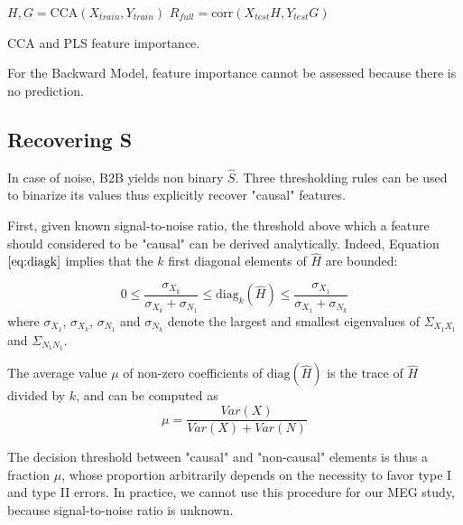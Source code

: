 \begin{algorithm}[H]
      $H, G = \text{CCA}(X_{train},
Y_{train})$\; $R_{full} = \text{corr}(X_{test} H, Y_{test} G)$\;

     
\caption{CCA and PLS feature importance.} \label{algorithm:cdp_fi}
\end{algorithm}

For the Backward Model, feature importance cannot be assessed because there is
no prediction.

\subsection{Recovering S}
\label{recovering}

In case of noise, B2B yields non binary $\hat S$. Three thresholding rules can
be used to binarize its values thus explicitly recover "causal" features.

First, given known signal-to-noise ratio, the threshold above which a feature
should considered to be "causal" can be derived analytically. Indeed, Equation
$\ref{eq:diagk}$ implies that the $k$ first diagonal elements of $\hat H$ are
bounded:  %

$$0 \leq \frac{\sigma_{X_k}}{\sigma_{X_k} +\sigma_{N_1}} \leq
\text{diag}_k(\hat{H})\leq  \frac{\sigma_{X_1}}{\sigma_{X_1} +\sigma_{N_k}}$$
where $\sigma_{X_1}$, $\sigma_{X_k}$, $\sigma_{N_1}$ and $\sigma_{N_k}$ denote
the largest and smallest eigenvalues of $\Sigma_{X_1 X_1}$ and $\Sigma_{N_1
N_1}$.

The average value $\mu$ of non-zero coefficients of $\text{diag}(\hat H)$ is the
trace of $\hat H$ divided by $k$, and can be computed as
\begin{equation}
\mu = \frac{Var(X)}{Var(X)+Var(N)}
\end{equation}

The decision threshold between "causal" and "non-causal" elements is thus a fraction
$\mu$, whose proportion arbitrarily depends on the necessity to favor type I and
type II errors. In practice, we cannot use this procedure for our MEG study,
because signal-to-noise ratio is unknown.

